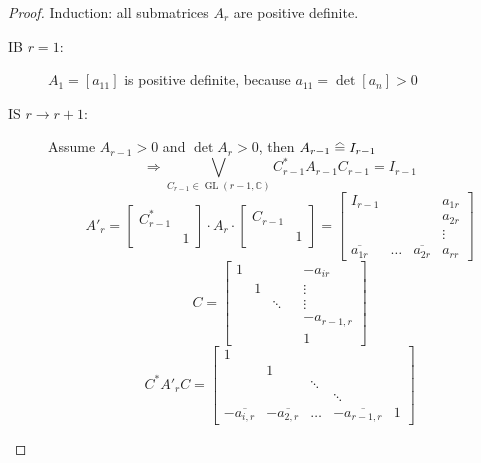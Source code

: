 \documentclass[a4paper,landscape,twocolumn]{article}
\newcommand\equalhat{\mathrel{\stackon[1.5pt]{=}{\stretchto{%
    \scalerel*[\widthof{=}]{\wedge}{\rule{1ex}{3ex}}}{0.5ex}}}}
\theoremstyle{definition}
\begin{document}
\begin{proof}
  Induction: all submatrices $A_r$ are positive definite.
  \begin{description}
    \item[IB $r=1$:]
      $A_1 = [a_{11}]$ is positive definite, because $a_{11} = \det[a_n] > 0$
    \item[IS $r\to r+1$:]
      Assume $A_{r-1} > 0$ and $\det{A_r} > 0$, then $A_{r-1} \equalhat I_{r-1}$
      \[ \Rightarrow \bigvee_{C_{r-1} \in \operatorname{GL}(r-1,\mathbb C)} C^*_{r-1} A_{r-1} C_{r-1} = I_{r-1} \]
      \[
        A'_r = \begin{bmatrix}
          C^*_{r-1} & \\
                    & 1
        \end{bmatrix}
        \cdot
        A_r
        \cdot
        \begin{bmatrix}
          C_{r-1} & \\
                  & 1
        \end{bmatrix}
        = \begin{bmatrix}
          I_{r-1}           &        &                   & a_{1r} \\
                            &        &                   & a_{2r} \\
                            &        &                   & \vdots \\
          \overline{a_{1r}} & \ldots & \overline{a_{2r}} & a_{rr}
        \end{bmatrix}
      \] \[
        C = \begin{bmatrix}
          1 &   &    &    & -a_{ir} \\
            & 1 &    &    & \vdots \\
            &   & \ddots & & \vdots \\
            &   &        & & -a_{r-1,r} \\
            &   &        & & 1
        \end{bmatrix}
      \] \[
        C^* A'_r C = \begin{bmatrix}
          1 &   &        &      &      \\
            & 1 &        &      &      \\
            &   & \ddots &      &      \\
            &   &        & \ddots &      \\
          -\overline{a_{i,r}} & -\overline{a_{2,r}} & \ldots & -\overline{a_{r-1,r}} & 1
        \end{bmatrix}
\]
\end{description}
\end{proof}
\end{document}
